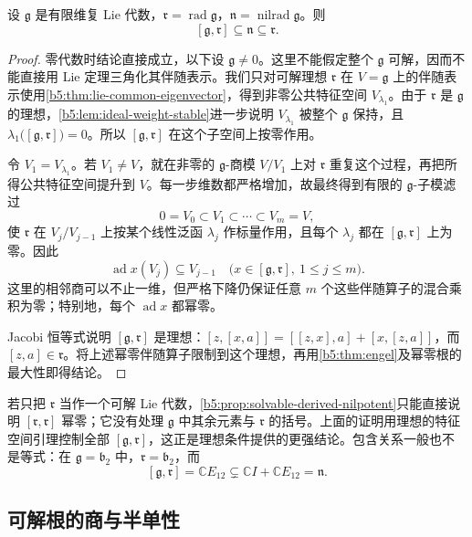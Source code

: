 \begin{proposition}\label{b5:prop:radical-commutator-nilpotent}
	设 \(\mathfrak g\) 是有限维复 Lie 代数，\(\mathfrak r=\operatorname{rad}\mathfrak g\)，\(\mathfrak n=\operatorname{nilrad}\mathfrak g\)。则
	\[
		[\mathfrak g,\mathfrak r]\subseteq\mathfrak n\subseteq\mathfrak r.
	\]
\end{proposition}
\begin{proof}
	零代数时结论直接成立，以下设 \(\mathfrak g\ne0\)。这里不能假定整个 \(\mathfrak g\) 可解，因而不能直接用 Lie 定理三角化其伴随表示。我们只对可解理想 \(\mathfrak r\) 在 \(V=\mathfrak g\) 上的伴随表示使用\cref{b5:thm:lie-common-eigenvector}，得到非零公共特征空间 \(V_{\lambda_1}\)。由于 \(\mathfrak r\) 是 \(\mathfrak g\) 的理想，\cref{b5:lem:ideal-weight-stable}进一步说明 \(V_{\lambda_1}\) 被整个 \(\mathfrak g\) 保持，且 \(\lambda_1\bigl([\mathfrak g,\mathfrak r]\bigr)=0\)。所以 \([\mathfrak g,\mathfrak r]\) 在这个子空间上按零作用。

	令 \(V_1=V_{\lambda_1}\)。若 \(V_1\ne V\)，就在非零的 \(\mathfrak g\)-商模 \(V/V_1\) 上对 \(\mathfrak r\) 重复这个过程，再把所得公共特征空间提升到 \(V\)。每一步维数都严格增加，故最终得到有限的 \(\mathfrak g\)-子模滤过
	\[
		0=V_0\subset V_1\subset\cdots\subset V_m=V,
	\]
	使 \(\mathfrak r\) 在 \(V_j/V_{j-1}\) 上按某个线性泛函 \(\lambda_j\) 作标量作用，且每个 \(\lambda_j\) 都在 \([\mathfrak g,\mathfrak r]\) 上为零。因此
	\[
		\operatorname{ad}x(V_j)\subseteq V_{j-1} \quad\bigl(x\in[\mathfrak g,\mathfrak r],\ 1\le j\le m\bigr).
	\]
	这里的相邻商可以不止一维，但严格下降仍保证任意 \(m\) 个这些伴随算子的混合乘积为零；特别地，每个 \(\operatorname{ad}x\) 都幂零。

	Jacobi 恒等式说明 \([\mathfrak g,\mathfrak r]\) 是理想：\([z,[x,a]]=[[z,x],a]+[x,[z,a]]\)，而 \([z,a]\in\mathfrak r\)。将上述幂零伴随算子限制到这个理想，再用\cref{b5:thm:engel}及幂零根的最大性即得结论。
\end{proof}

若只把 \(\mathfrak r\) 当作一个可解 Lie 代数，\cref{b5:prop:solvable-derived-nilpotent}只能直接说明 \([\mathfrak r,\mathfrak r]\) 幂零；它没有处理 \(\mathfrak g\) 中其余元素与 \(\mathfrak r\) 的括号。上面的证明用理想的特征空间引理控制全部 \([\mathfrak g,\mathfrak r]\)，这正是理想条件提供的更强结论。包含关系一般也不是等式：在 \(\mathfrak g=\mathfrak b_2\) 中，\(\mathfrak r=\mathfrak b_2\)，而
\[
	[\mathfrak g,\mathfrak r]=\mathbb CE_{12} \subsetneq\mathbb CI+\mathbb CE_{12}=\mathfrak n.
\]

\subsection{可解根的商与半单性}
\label{b5:subsec:1203:03}

